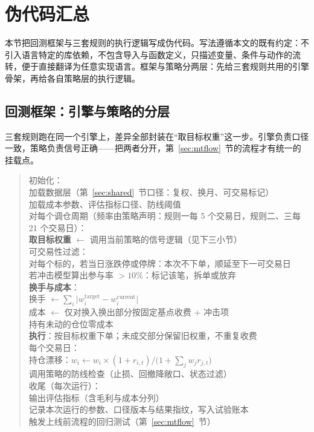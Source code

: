 \section{伪代码汇总}\label{sec:pseudocode}

本节把回测框架与三套规则的执行逻辑写成伪代码。写法遵循本文的既有约定：不引入语言特定的库依赖，不包含导入与函数定义，只描述变量、条件与动作的流转，便于直接翻译为任意实现语言。框架与策略分两层：先给三套规则共用的引擎骨架，再给各自策略层的执行逻辑。

\subsection{回测框架：引擎与策略的分层}

三套规则跑在同一个引擎上，差异全部封装在“取目标权重”这一步。引擎负责口径一致，策略负责信号正确——把两者分开，第~\ref{sec:mtflow}~节的流程才有统一的挂载点。

\begin{quote}\ttfamily\small
初始化：\\
\quad 加载数据层（第~\ref{sec:shared}~节口径：复权、换月、可交易标记）\\
\quad 加载成本参数、评估指标口径、防线阈值\\[2pt]
对每个调仓周期（频率由策略声明：规则一每 5 个交易日，规则二、三每 21 个交易日）：\\
\quad \textbf{取目标权重} $\gets$ 调用当前策略的信号逻辑（见下三小节）\\
\quad 可交易性过滤：\\
\qquad 对每个标的，若当日涨跌停或停牌：本次不下单，顺延至下一可交易日\\
\qquad 若冲击模型算出参与率 $>10\%$：标记该笔，拆单或放弃\\[2pt]
\quad \textbf{换手与成本}：\\
\qquad 换手 $\gets\sum_i\bigl|w_{i}^{\text{target}}-w_{i}^{\text{current}}\bigr|$\\
\qquad 成本 $\gets$ 仅对换入换出部分按固定基点收费 $+$ 冲击项\\
\qquad 持有未动的仓位零成本\\[2pt]
\quad \textbf{执行}：按目标权重下单；未成交部分保留旧权重，不重复收费\\[2pt]
每个交易日：\\
\quad 持仓漂移：$w_i \gets w_i\times(1+r_{i,t})/\bigl(1+\sum_j w_j r_{j,t}\bigr)$\\
\quad 调用策略的防线检查（止损、回撤降敞口、状态过滤）\\[2pt]
收尾（每次运行）：\\
\quad 输出评估指标（含毛利与成本分列）\\
\quad 记录本次运行的参数、口径版本与结果指纹，写入试验账本\\
\quad 触发上线前流程的回归测试（第~\ref{sec:mtflow}~节）
\end{quote}

